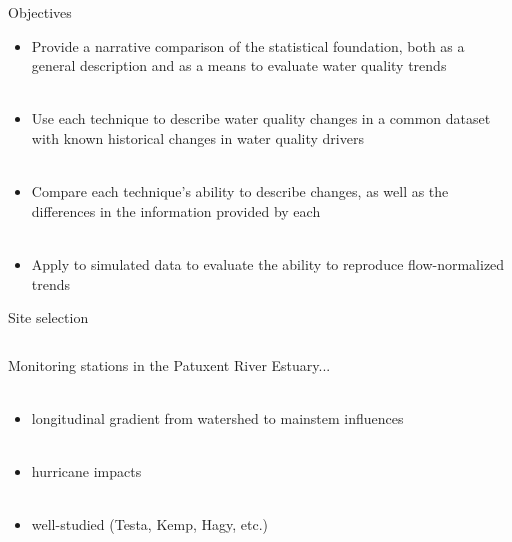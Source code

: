 \documentclass[serif]{beamer}\usepackage[]{graphicx}\usepackage[]{color}
\begin{document}
\begin{frame}{Objectives}
\begin{itemize}
\item Provide a narrative comparison of the statistical foundation, both as a general description and as a means to evaluate water quality trends \\~\\
\item Use each technique to describe water quality changes in a common dataset with known historical changes in water quality drivers \\~\\
\item Compare each technique's ability to describe changes, as well as the differences in the information provided by each \\~\\
\item Apply to simulated data to evaluate the ability to reproduce flow-normalized trends
\end{itemize}
\end{frame}

\begin{frame}{Site selection}
\begin{columns}[T]
\begin{column}{0.45\textwidth}
Monitoring stations in the Patuxent River Estuary... \\~\\
\begin{itemize}
\item longitudinal gradient from watershed to mainstem influences \\~\\
\item hurricane impacts \\~\\
\item well-studied (Testa, Kemp, Hagy, etc.)
\end{itemize}
\end{column}
\begin{column}{0.45\textwidth}
\centerline{}
\end{column}
\end{columns}
\end{frame}
\end{document}

